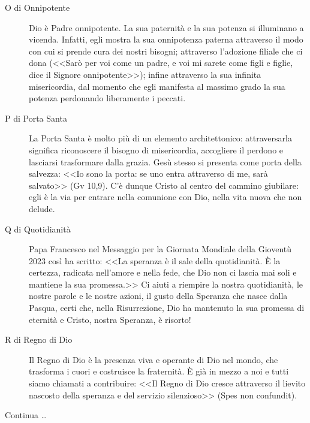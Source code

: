 \begin{description}

  \item[O di Onnipotente] Dio è Padre onnipotente. La sua paternità e la sua potenza si illuminano a vicenda. Infatti, egli mostra la sua onnipotenza paterna attraverso il modo con cui si prende cura dei nostri bisogni; attraverso l'adozione filiale che ci dona (<<Sarò per voi come un padre, e voi mi sarete come figli e figlie, dice il Signore onnipotente>>); infine attraverso la sua infinita misericordia, dal momento che egli manifesta al massimo grado la sua potenza perdonando liberamente i peccati.

  \item[P di Porta Santa] La Porta Santa è molto più di un elemento architettonico: attraversarla significa riconoscere il bisogno di misericordia, accogliere il perdono e lasciarsi trasformare dalla grazia. Gesù stesso si presenta come porta della salvezza: <<Io sono la porta: se uno entra attraverso di me, sarà salvato>> (Gv 10,9). C'è dunque Cristo al centro del cammino giubilare: egli è la via per entrare nella comunione con Dio, nella vita nuova che non delude.

  \item[Q di Quotidianità] Papa Francesco nel Messaggio per la Giornata Mondiale della Gioventù 2023 così ha scritto: <<La speranza è il sale della quotidianità. È la certezza, radicata nell'amore e nella fede, che Dio non ci lascia mai soli e mantiene la sua promessa.>> Ci aiuti a riempire la nostra quotidianità, le nostre parole e le nostre azioni, il gusto della Speranza che nasce dalla Pasqua, certi che, nella Risurrezione, Dio ha mantenuto la sua promessa di eternità e Cristo, nostra Speranza, è risorto!

  \item[R di Regno di Dio] Il Regno di Dio è la presenza viva e operante di Dio nel mondo, che trasforma i cuori e costruisce la fraternità. È già in mezzo a noi e tutti siamo chiamati a contribuire: <<Il Regno di Dio cresce attraverso il lievito nascosto della speranza e del servizio silenzioso>> (Spes non confundit).
\end{description}

Continua \ldots

